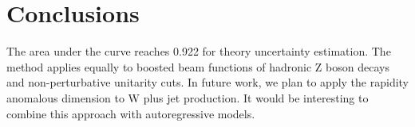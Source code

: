 \section{Conclusions}\label{sec:conclusions}

The area under the curve reaches 0.922 for theory uncertainty
estimation. The method applies equally to boosted beam functions of
hadronic Z boson decays and non-perturbative unitarity cuts. In future
work, we plan to apply the rapidity anomalous dimension to W plus jet
production. It would be interesting to combine this approach with
autoregressive models.

